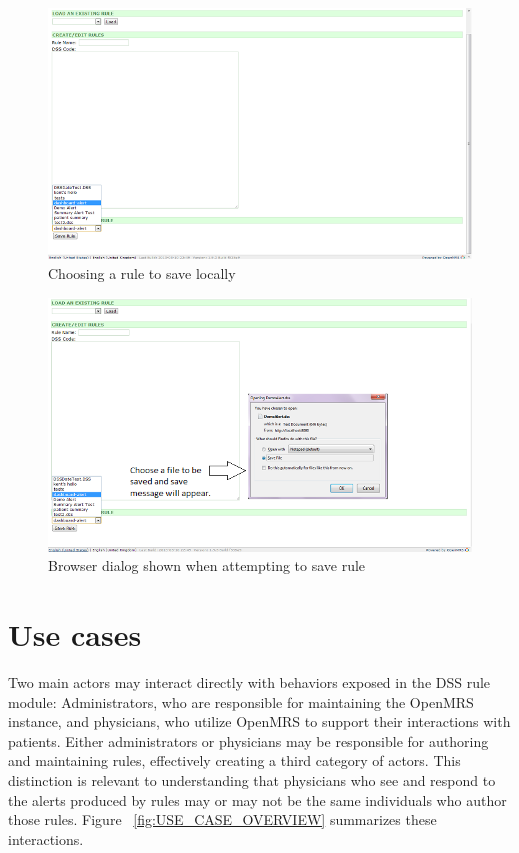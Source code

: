\documentclass[12pt,letterpaper]{article}
\begin{document}
\begin{figure}\begin{center}
\includegraphics[width=6.5in]{user_guide/save_rule.png}
\end{center}
\caption{Choosing a rule to save locally}
\label{fig:SAVE_RULE}
\end{figure}

\begin{figure}\begin{center}
\includegraphics[width=6.5in]{user_guide/save_rule_dialog.png}
\end{center}
\caption{Browser dialog shown when attempting to save rule}
\label{fig:SAVE_RULE_DIALOG}
\end{figure}

\newpage 
\section{Use cases} \label{sec:USE_CASES}

Two main actors may interact directly with behaviors exposed in the 
DSS rule module: Administrators, who are responsible for maintaining 
the OpenMRS instance, and physicians, who utilize OpenMRS to 
support their interactions with patients. Either administrators 
or physicians may be responsible for authoring and maintaining 
rules, effectively creating a third category of actors. This 
distinction is relevant to understanding that physicians who see 
and respond to the alerts produced by rules may or may not be the 
same individuals who author those rules. Figure ~\ref{fig:USE_CASE_OVERVIEW} summarizes these interactions.
\end{document}
